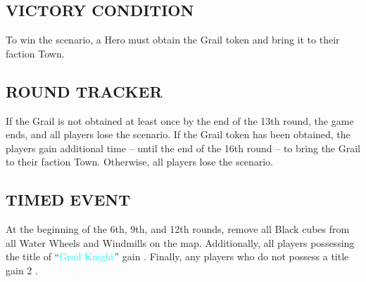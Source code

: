 \begin{multicols*}{2}
\subsection*{\MakeUppercase{Victory Condition}}
To win the scenario, a Hero must obtain the Grail token and bring it to their faction Town.
\subsection*{\MakeUppercase{Round Tracker}}
If the Grail is not obtained at least once by the end of the 13th round, the game ends, and all players lose the scenario.
If the Grail token has been obtained, the players gain additional time – until the end of the 16th round – to bring the Grail to their faction Town. Otherwise, all players lose the scenario.
\subsection*{\MakeUppercase{Timed Event}}
At the beginning of the 6th, 9th, and 12th rounds, remove all Black cubes from all Water Wheels and Windmills on the map. Additionally, all players possessing the title of “\textcolor{cyan}{Grail Knight}” gain . Finally, any players who do not possess a title gain 2 .
\end{multicols*}
